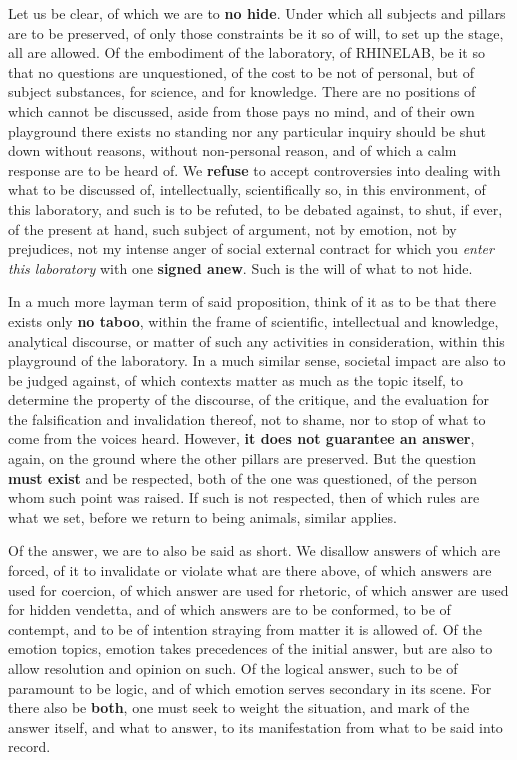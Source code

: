 \documentclass[10pt,a4paper]{article}
\begin{document}
Let us be clear, of which we are to \textbf{no hide}. Under which all subjects and pillars are to be preserved, of only those constraints be it so of will, to set up the stage, all are allowed. Of the embodiment of the laboratory, of RHINELAB, be it so that no questions are unquestioned, of the cost to be not of personal, but of subject substances, for science, and for knowledge. There are no positions of which cannot be discussed, aside from those pays no mind, and of their own playground there exists no standing nor any particular inquiry should be shut down without reasons, without non-personal reason, and of which a calm response are to be heard of. We \textbf{refuse} to accept controversies into dealing with what to be discussed of, intellectually, scientifically so, in this environment, of this laboratory, and such is to be refuted, to be debated against, to shut, if ever, of the present at hand, such subject of argument, not by emotion, not by prejudices, not my intense anger of social external contract for which you \textit{enter this laboratory} with one \textbf{signed anew}. Such is the will of what to not hide. 

In a much more layman term of said proposition, think of it as to be that there exists only \textbf{no taboo}, within the frame of scientific, intellectual and knowledge, analytical discourse, or matter of such any activities in consideration, within this playground of the laboratory. In a much similar sense, societal impact are also to be judged against, of which contexts matter as much as the topic itself, to determine the property of the discourse, of the critique, and the evaluation for the falsification and invalidation thereof, not to shame, nor to stop of what to come from the voices heard. However, \textbf{it does not guarantee an answer}, again, on the ground where the other pillars are preserved. But the question \textbf{must exist} and be respected, both of the one was questioned, of the person whom such point was raised. If such is not respected, then of which rules are what we set, before we return to being animals, similar applies. 

Of the answer, we are to also be said as short. We disallow answers of which are forced, of it to invalidate or violate what are there above, of which answers are used for coercion, of which answer are used for rhetoric, of which answer are used for hidden vendetta, and of which answers are to be conformed, to be of contempt, and to be of intention straying from matter it is allowed of. Of the emotion topics, emotion takes precedences of the initial answer, but are also to allow resolution and opinion on such. Of the logical answer, such to be of paramount to be logic, and of which emotion serves secondary in its scene. For there also be \textbf{both}, one must seek to weight the situation, and mark of the answer itself, and what to answer, to its manifestation from what to be said into record. 
\end{document}
